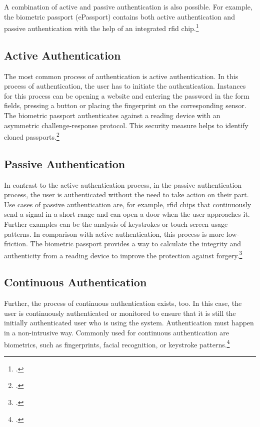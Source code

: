 A combination of active and passive authentication is also possible. For example, the biometric passport (\frqq ePassport\flqq) contains both active authentication and passive authentication with the help of an integrated \gls{rfid} chip.\footcite[See][545]{eckert-it-sec-9}


\subsection{Active Authentication}
\label{subsec:active_auth}

The most common process of authentication is active authentication. In this process of authentication, the user has to initiate the authentication. Instances for this process can be opening a website and entering the password in the form fields, pressing a button or placing the fingerprint on the corresponding sensor. The biometric passport authenticates against a reading device with an asymmetric challenge-response protocol. This security measure helps to identify cloned passports.\footcites[See][185--186]{10.1007/978-3-319-05452-0_14} [See][545]{eckert-it-sec-9}

\subsection{Passive Authentication}

In contrast to the active authentication process, in the passive authentication process, the user is authenticated without the need to take action on their part. Use cases of passive authentication are, for example, \gls{rfid} chips that continuously send a signal in a short-range and can open a door when the user approaches it. Further examples can be the analysis of keystrokes or touch screen usage patterns. In comparison with active authentication, this process is more low-friction. The biometric passport provides a way to calculate the integrity and authenticity from a reading device to improve the protection against forgery.\footcites[See][186]{10.1007/978-3-319-05452-0_14}[See][]{185306}[See][545]{eckert-it-sec-9}

\subsection{Continuous Authentication}

Further, the process of continuous authentication exists, too. In this case, the user is continuously authenticated or monitored to ensure that it is still the initially authenticated user who is using the system. Authentication must happen in a non-intrusive way. Commonly used for continuous authentication are biometrics, such as fingerprints, facial recognition, or keystroke patterns.\footcites[See][236--238]{dasgupta2017multi}[See][]{7444124}

